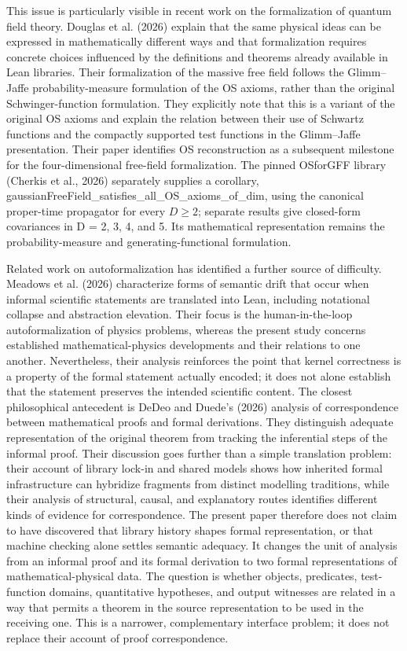 \documentclass[pdflatex,sn-apa]{sn-jnl}
\begin{document}
This issue is particularly visible in recent work on the formalization of quantum field theory. Douglas et al. (2026) explain that the same physical ideas can be expressed in mathematically different ways and that formalization requires concrete choices influenced by the definitions and theorems already available in Lean libraries. Their formalization of the massive free field follows the Glimm--Jaffe probability-measure formulation of the OS axioms, rather than the original Schwinger-function formulation. They explicitly note that this is a variant of the original OS axioms and explain the relation between their use of Schwartz functions and the compactly supported test functions in the Glimm--Jaffe presentation. Their paper identifies OS reconstruction as a subsequent milestone for the four-dimensional free-field formalization. The pinned OSforGFF library (Cherkis et al., 2026) separately supplies a corollary, gaussianFreeField\_satisfies\_all\_OS\_axioms\_of\_dim, using the canonical proper-time propagator for every \(D\geq 2\); separate results give closed-form covariances in D = 2, 3, 4, and 5. Its mathematical representation remains the probability-measure and generating-functional formulation.

Related work on autoformalization has identified a further source of difficulty. Meadows et al. (2026) characterize forms of semantic drift that occur when informal scientific statements are translated into Lean, including notational collapse and abstraction elevation. Their focus is the human-in-the-loop autoformalization of physics problems, whereas the present study concerns established mathematical-physics developments and their relations to one another. Nevertheless, their analysis reinforces the point that kernel correctness is a property of the formal statement actually encoded; it does not alone establish that the statement preserves the intended scientific content. The closest philosophical antecedent is DeDeo and Duede's (2026) analysis of correspondence between mathematical proofs and formal derivations. They distinguish adequate representation of the original theorem from tracking the inferential steps of the informal proof. Their discussion goes further than a simple translation problem: their account of library lock-in and shared models shows how inherited formal infrastructure can hybridize fragments from distinct modelling traditions, while their analysis of structural, causal, and explanatory routes identifies different kinds of evidence for correspondence. The present paper therefore does not claim to have discovered that library history shapes formal representation, or that machine checking alone settles semantic adequacy. It changes the unit of analysis from an informal proof and its formal derivation to two formal representations of mathematical-physical data. The question is whether objects, predicates, test-function domains, quantitative hypotheses, and output witnesses are related in a way that permits a theorem in the source representation to be used in the receiving one. This is a narrower, complementary interface problem; it does not replace their account of proof correspondence.
\end{document}
